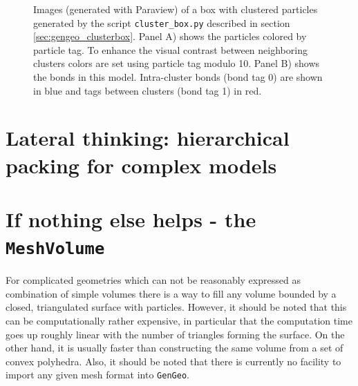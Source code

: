 \begin{figure}
\begin{center}
\end{center}
\caption{Images (generated with Paraview) of a box with clustered particles generated by the script \texttt{cluster\_box.py} described in section \ref{sec:gengeo_clusterbox}. Panel A) shows the particles colored by particle tag. To enhance the visual contrast between neighboring clusters colors are set using particle tag modulo 10.  Panel B) shows the bonds in this model. Intra-cluster bonds (bond tag 0) are shown in blue and tags between clusters (bond tag 1) in red.} \label{fig:cluster_box}
\end{figure}

\section{Lateral thinking: hierarchical packing for complex models}

\section{If nothing else helps - the \texttt{MeshVolume}}
\label{sec:mesh_volume}

For complicated geometries which can not be reasonably expressed as combination of simple volumes there is a way to fill any volume bounded by a closed, triangulated surface with particles. However, it should be noted that this can be computationally rather expensive, in particular that the computation time goes up roughly linear with the number of triangles forming the surface. On the other hand, it is usually faster than constructing the same volume from a set of convex polyhedra. Also, it should be noted that there is currently no facility to import any given mesh format into \texttt{GenGeo}. 

